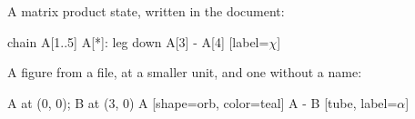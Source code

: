 \documentclass{article}
\begin{document}
A matrix product state, written in the document:

\begin{tnvfigure}[name=mps]
chain A[1..5]
A[*]: leg down
A[3] - A[4]  [label=$\chi$]
\end{tnvfigure}

A figure from a file, at a smaller unit, and one without a name:


\begin{tnvfigure}
A at (0, 0); B at (3, 0)
A [shape=orb, color=teal]
A - B [tube, label=$\alpha$]
\end{tnvfigure}
\end{document}
